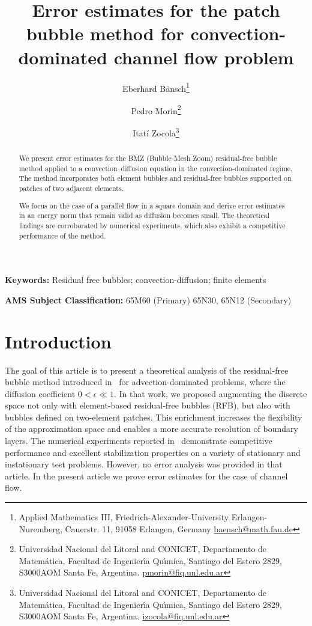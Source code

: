 \documentclass{article}
\title{Error estimates for the patch bubble method for convection-dominated channel flow problem}
\author{Eberhard B\"ansch\footnote{Applied Mathematics III,
Friedrich-Alexander-University Erlangen-Nuremberg,
Cauerstr. 11, 91058 Erlangen, Germany
\href{mailto:baensch@math.fau.de}{baensch@math.fau.de}}
\and 
Pedro Morin\footnote{Universidad Nacional del Litoral and CONICET, 
Departamento de Matem\'atica, 
Facultad de Ingenier\'{\i}a Qu\'{\i}mica, Santiago del Estero 2829, S3000AOM Santa Fe, Argentina. 
\href{mailto:pmorin@fiq.unl.edu.ar}{pmorin@fiq.unl.edu.ar}}
\and Itatí Zocola\footnote{Universidad Nacional del Litoral and CONICET, 
Departamento de Matem\'atica, 
Facultad de Ingenier\'{\i}a Qu\'{\i}mica, Santiago del Estero 2829, S3000AOM Santa Fe, Argentina. 
\href{mailto:izocola@fiq.unl.edu.ar}{izocola@fiq.unl.edu.ar}}
}
\date{}
\begin{document}
	\maketitle




\begin{abstract}
We present error estimates for the BMZ (Bubble Mesh Zoom) residual-free bubble method applied to a convection–diffusion equation in the convection-dominated regime.
The method incorporates both element bubbles and residual-free bubbles supported on patches of two adjacent elements.

We focus on the case of a parallel flow in a square domain and derive error estimates in an energy norm that remain valid as diffusion becomes small.
The theoretical findings are corroborated by numerical experiments, which also exhibit a competitive performance of the method.
\end{abstract}

\noindent\textbf{Keywords:} 
Residual free bubbles; convection-diffusion; finite elements


\noindent\textbf{AMS Subject Classification:}
65M60 (Primary) 65N30, 65N12 (Secondary)

\tableofcontents


\section{Introduction}

The goal of this article is to present a theoretical analysis of the residual-free bubble method introduced in~\cite{BMZ} for advection-dominated problems, where the diffusion coefficient $0<\epsilon \ll 1$. In that work, we proposed augmenting the discrete space not only with element-based residual-free bubbles (RFB), but also with bubbles defined on two-element patches. This enrichment increases the flexibility of the approximation space and enables a more accurate resolution of boundary layers. The numerical experiments reported in~\cite{BMZ} demonstrate competitive performance and excellent stabilization properties on a variety of stationary and instationary test problems. However, no error analysis was provided in that article. In the present article we prove error estimates for the case of channel flow.
\end{document}
